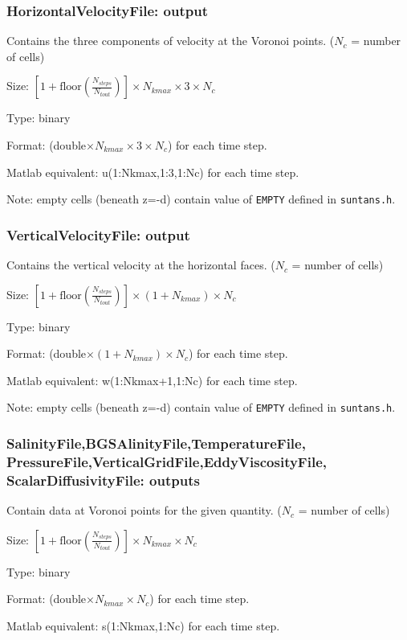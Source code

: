 \subsubsection{HorizontalVelocityFile: output}

Contains the three components of velocity at the Voronoi points. ($N_c$ = number of cells)
\begin{list}{}
\item Size: $\left[1+\mbox{floor}\left(\frac{N_{steps}}{N_{tout}}\right)\right]\times N_{kmax} \times 3 \times N_c$
\item Type: binary
\item Format: (double$\times N_{kmax} \times 3 \times N_c$) for each time step.  
\item Matlab equivalent: u(1:Nkmax,1:3,1:Nc) for each time step.
\end{list}

\bigskip
\noindent
Note: empty cells (beneath z=-d) contain value of \verb+EMPTY+ defined in \verb+suntans.h+.


\subsubsection{VerticalVelocityFile: output}

Contains the vertical velocity at the horizontal faces. ($N_c$ = number of cells)
\begin{list}{}
\item Size: $\left[1+\mbox{floor}\left(\frac{N_{steps}}{N_{tout}}\right)\right]\times (1+N_{kmax}) \times N_c$
\item Type: binary
\item Format: (double$\times (1+N_{kmax})\times N_c$) for each time step.  
\item Matlab equivalent: w(1:Nkmax+1,1:Nc) for each time step.  
\end{list}

\bigskip
\noindent
Note: empty cells (beneath z=-d) contain value of \verb+EMPTY+ defined in \verb+suntans.h+.

\subsubsection{SalinityFile,BGSAlinityFile,TemperatureFile,\\PressureFile,VerticalGridFile,EddyViscosityFile,\\ScalarDiffusivityFile: outputs}

Contain data at Voronoi points for the given quantity. ($N_c$ = number of cells)
\begin{list}{}
\item Size: $\left[1+\mbox{floor}\left(\frac{N_{steps}}{N_{tout}}\right)\right]\times N_{kmax} \times N_c$
\item Type: binary
\item Format: (double$\times N_{kmax}\times N_c$) for each time step.  
\item Matlab equivalent: s(1:Nkmax,1:Nc) for each time step.  
\end{list}

